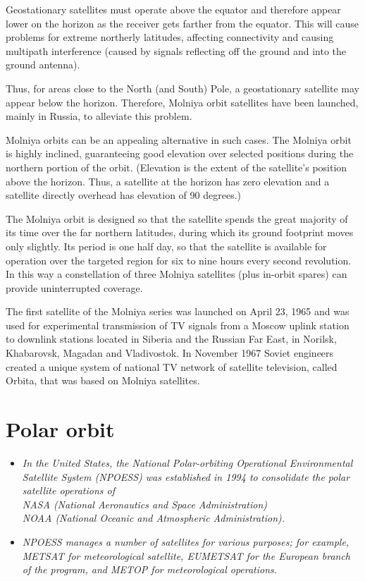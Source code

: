 Geostationary satellites must operate above the equator and therefore
appear lower on the horizon as the receiver gets farther from the
equator. This will cause problems for extreme northerly latitudes,
affecting connectivity and causing multipath interference (caused by
signals reflecting off the ground and into the ground antenna).

Thus, for areas close to the North (and South) Pole, a geostationary
satellite may appear below the horizon. Therefore, Molniya orbit
satellites have been launched, mainly in Russia, to alleviate this
problem.

Molniya orbits can be an appealing alternative in such cases. The
Molniya orbit is highly inclined, guaranteeing good elevation over
selected positions during the northern portion of the orbit. (Elevation
is the extent of the satellite's position above the horizon. Thus, a
satellite at the horizon has zero elevation and a satellite directly
overhead has elevation of 90 degrees.)

The Molniya orbit is designed so that the satellite spends the great
majority of its time over the far northern latitudes, during which its
ground footprint moves only slightly. Its period is one half day, so
that the satellite is available for operation over the targeted region
for six to nine hours every second revolution. In this way a
constellation of three Molniya satellites (plus in-orbit spares) can
provide uninterrupted coverage.

The first satellite of the Molniya series was launched on April 23, 1965
and was used for experimental transmission of TV signals from a Moscow
uplink station to downlink stations located in Siberia and the Russian
Far East, in Norilsk, Khabarovsk, Magadan and Vladivostok. In November
1967 Soviet engineers created a unique system of national TV network of
satellite television, called Orbita, that was based on Molniya
satellites.

\section{Polar orbit}\label{polar-orbit}

\begin{itemize}
\item
  \emph{In the United States, the National Polar-orbiting Operational
  Environmental Satellite System (NPOESS) was established in 1994 to
  consolidate the polar satellite operations of\\
  NASA (National Aeronautics and Space Administration)\\
  NOAA (National Oceanic and Atmospheric Administration).}
\item
  \emph{NPOESS manages a number of satellites for various purposes; for
  example, METSAT for meteorological satellite, EUMETSAT for the
  European branch of the program, and METOP for meteorological
  operations.}
\end{itemize}


